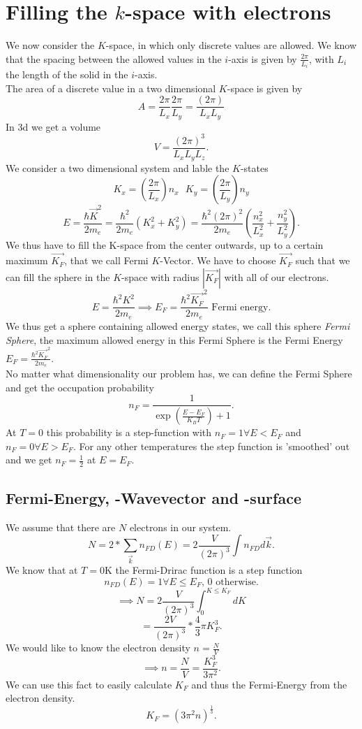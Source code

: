 \documentclass{report}
\begin{document}
\section{Filling the $k$-space with electrons}
We now consider the $K$-space, in which only discrete values are allowed. We know that the spacing between the allowed values in the $i$-axis is given by $\frac{2\pi}{L_i}$, with $L_i$ the length of the solid in the $i$-axis.\\
The area of a discrete value in a two dimensional $K$-space is given by \[
	A = \frac{2\pi}{L_x} \frac{2\pi}{L_y} = \frac{\left( 2\pi \right) }{L_x L_y}
\] In 3d we get a volume \[
V = \frac{\left( 2\pi \right) ^3}{L_x L_y L_z}
.\] We consider a two dimensional system and lable the $K$-states \[
K_x = \left( \frac{2\pi}{L_x} \right) n_x \text{        } K_y = \left( \frac{2\pi}{L_y} \right) n_y
\] \[
E = \frac{\hbar \vec{K}^2}{2 m_e} = \frac{\hbar^2}{2 m_e} \left( K_x^2 + K_y^2 \right) = \frac{\hbar^2 \left( 2\pi \right) ^2}{2 m_e} \left( \frac{n_x^2}{L_x^2} + \frac{n_y^2}{L_y^2} \right) 
.\] We thus have to fill the K-space from the center outwards, up to a certain maximum $\vec{K_F}$, that we call Fermi $K$-Vector. We have to choose $\vec{K_F}$ such that we can fill the sphere in the $K$-space with radius $|\vec{K_F}|$ with all of our electrons. \[
E= \frac{\hbar^2 K^2}{2m_e} \implies E_F = \frac{\hbar^2 \vec{K_F}^2}{2m_e} \text{ Fermi energy}
.\] We thus get a sphere containing allowed energy states, we call this sphere \emph{Fermi Sphere}, the maximum allowed energy in this Fermi Sphere is the Fermi Energy $E_F = \frac{\hbar^2 \vec{K_F}^2}{2 m_e}$. \\
No matter what dimensionality our problem has, we can define the Fermi Sphere and get the occupation probability \[
	n_F = \frac{1}{\exp\left( \frac{E - E_F}{K_B T} \right) + 1}
.\] At $T =0$ this probability is a step-function with $n_F = 1 \forall E < E_F$ and $n_F = 0 \forall E > E_F$. For any other temperatures the step function is 'smoothed' out and we get $n_F = \frac{1}{2} $ at $E = E_F$.
\subsection{Fermi-Energy, -Wavevector and -surface}
We assume that there are $N$ electrons in our system. \[
	N = 2* \sum_{\vec{k}} n_{FD}\left( E \right) = 2 \frac{V}{\left( 2 \pi \right) ^3} \int n_{FD} d\vec{k}
.\] We know that at $T = 0 \text{K}$ the Fermi-Drirac function is a step function \[
n_{FD} \left( E \right) = 1 \forall E \le E_F \text{, } 0 \text{ otherwise}
.\] \[
\implies N = 2 \frac{V}{\left( 2 \pi \right)^3} \int_0^{K \le K_F} dK
\] \[
= \frac{2V}{\left( 2 \pi \right) ^3} * \frac{4}{3} \pi K_F^3
.\] We would like to know the electron density $n = \frac{N}{V}$ \[
\implies n = \frac{N}{V} = \frac{K_F^3}{3 \pi^2}
.\] We can use this fact to easily calculate $K_F$ and thus the Fermi-Energy from the electron density. 
\[
	K_F = \left( 3 \pi^2 n \right) ^{\frac{1}{3}}
.\] 
\end{document}
